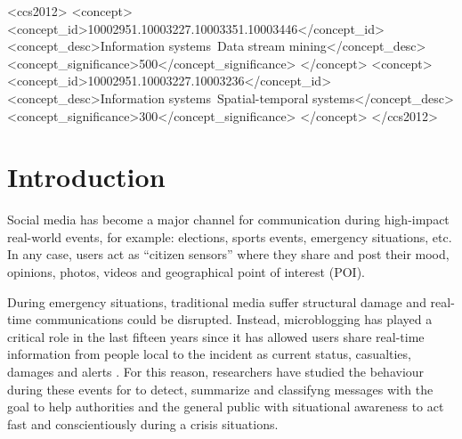 \documentclass[sigconf]{acmart}
\begin{document}
%
%
\begin{CCSXML}
	<ccs2012>
	<concept>
	<concept_id>10002951.10003227.10003351.10003446</concept_id>
	<concept_desc>Information systems~Data stream mining</concept_desc>
	<concept_significance>500</concept_significance>
	</concept>
	<concept>
	<concept_id>10002951.10003227.10003236</concept_id>
	<concept_desc>Information systems~Spatial-temporal systems</concept_desc>
	<concept_significance>300</concept_significance>
	</concept>
	</ccs2012>
\end{CCSXML}




\maketitle

\section{Introduction}
Social media has become a major channel for communication during high-impact real-world events, for example: elections, sports events, emergency situations, etc. In any case, users act as ``citizen sensors'' where they share and post their mood, opinions, photos, videos and geographical point of interest (POI).

During emergency situations, traditional media suffer structural damage and real-time communications could be disrupted. Instead, microblogging has played a critical role in the last fifteen years since it has allowed users share real-time information from people local to the incident as current status, casualties, damages and alerts \cite{kumar2011tweettracker,imran2013extracting,stowe2016identifying,reuterfifteen}. For this reason, researchers have studied the behaviour during these events for to detect, summarize and classifyng messages with the goal to help authorities and the general public with situational awareness to act fast and conscientiously during a crisis situations.
\end{document}

